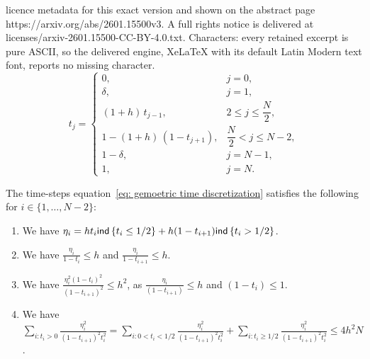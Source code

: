 \documentclass[10pt,a4paper]{amsart}
\def\eqref#1{equation~\ref{#1}}
\def\ind{{\sf ind}}
\newcommand{\bc}[1]{\left\{{#1}\right\}}
\begin{document}
licence metadata for this exact version and shown on the abstract page https://arxiv.org/abs/2601.15500v3. A full rights notice is delivered at licenses/arxiv-2601.15500-CC-BY-4.0.txt. Characters: every retained excerpt is pure ASCII, so the delivered engine, XeLaTeX with its default Latin Modern text font, reports no missing character.
\begin{equation}
\label{eq: gemoetric time discretization}
t_j =
\begin{cases}
0, & j = 0, \\[4pt]
\delta, & j = 1, \\[6pt]
(1+h)\, t_{j-1}, & 2 \le j \le \dfrac{N}{2}, \\[8pt]
1 - (1+h)\,(1 - t_{j+1}), & \dfrac{N}{2} < j \le N-2, \\[6pt]
1 - \delta, & j = N-1, \\[6pt]
1, & j = N .
\end{cases}
\end{equation}

\begin{lemma}
    \label{lemma: properties of time-steps}
    The time-steps \eqref{eq: gemoetric time discretization} satisfies the following for $i \in \{1, \ldots, N-2\}$:
    \begin{enumerate}[label = (\alph*)]
    \item\label{item: part a} We have $\eta_i = h t_i \ind\bc{t_{i} \le 1/2} + h (1-t_{i+1}) \ind\bc{t_i > 1/2}$.
    
    \item\label{item: part b} We have $\frac{\eta_i}{1-t_i} \le h$ and $\frac{\eta_i}{1-t_{i+1}} \le h$.
    
     \item\label{item: part c} We have $\frac{ \eta_i^2 (1-t_i)^2 }{(1-t_{i+1})^2} \le h^2 $, as $\frac{\eta_i}{(1-t_{i+1})} \le h$ and $(1-t_i) \le 1$.
     
     \item\label{item: part d} We have $\sum_{i : t_i >0}\frac{ \eta_i^2 }{(1-t_{i+1})^2 t_i^2} = \sum_{i: 0 < t_{i} < 1/2 }\frac{ \eta_i^2 }{(1-t_{i+1})^2 t_i^2} + \sum_{i: t_{i}\ge 1/2 }\frac{ \eta_i^2 }{(1-t_{i+1})^2 t_i^2} \le  4 h^2 N$.
\end{enumerate}
\end{lemma}
\end{document}
